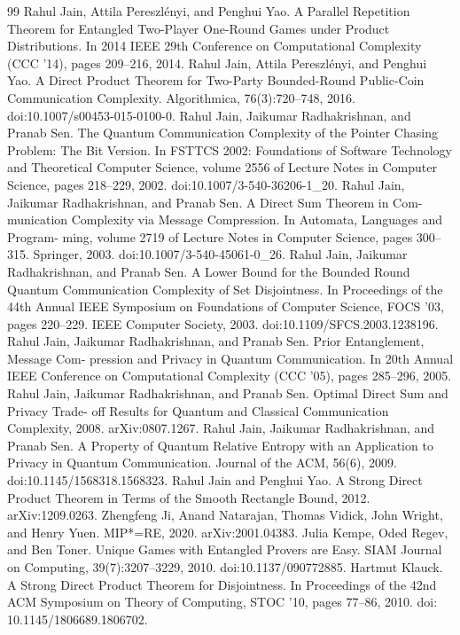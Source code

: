 \begin{thebibliography}{99}
 Rahul Jain, Attila Pereszlényi, and Penghui Yao. A Parallel Repetition Theorem for Entangled Two-Player One-Round Games under Product Distributions. In 2014 IEEE 29th Conference on Computational Complexity (CCC ’14), pages 209–216, 2014.
 Rahul Jain, Attila Pereszlényi, and Penghui Yao. A Direct Product Theorem for Two-Party Bounded-Round Public-Coin Communication Complexity. Algorithmica, 76(3):720–748, 2016. doi:10.1007/s00453-015-0100-0.
 Rahul Jain, Jaikumar Radhakrishnan, and Pranab Sen. The Quantum Communication Complexity of the Pointer Chasing Problem: The Bit Version. In FSTTCS 2002: Foundations of Software Technology and Theoretical Computer Science, volume 2556 of Lecture Notes in Computer Science, pages 218–229, 2002. doi:10.1007/3-540-36206-1\_20.
 Rahul Jain, Jaikumar Radhakrishnan, and Pranab Sen. A Direct Sum Theorem in Com- munication Complexity via Message Compression. In Automata, Languages and Program- ming, volume 2719 of Lecture Notes in Computer Science, pages 300–315. Springer, 2003. doi:10.1007/3-540-45061-0\_26.
 Rahul Jain, Jaikumar Radhakrishnan, and Pranab Sen. A Lower Bound for the Bounded Round Quantum Communication Complexity of Set Disjointness. In Proceedings of the 44th Annual IEEE Symposium on Foundations of Computer Science, FOCS ’03, pages 220–229. IEEE Computer Society, 2003. doi:10.1109/SFCS.2003.1238196.
 Rahul Jain, Jaikumar Radhakrishnan, and Pranab Sen. Prior Entanglement, Message Com- pression and Privacy in Quantum Communication. In 20th Annual IEEE Conference on Computational Complexity (CCC ’05), pages 285–296, 2005.
 Rahul Jain, Jaikumar Radhakrishnan, and Pranab Sen. Optimal Direct Sum and Privacy Trade- off Results for Quantum and Classical Communication Complexity, 2008. arXiv:0807.1267.
 Rahul Jain, Jaikumar Radhakrishnan, and Pranab Sen. A Property of Quantum Relative Entropy with an Application to Privacy in Quantum Communication. Journal of the ACM, 56(6), 2009. doi:10.1145/1568318.1568323.
 Rahul Jain and Penghui Yao. A Strong Direct Product Theorem in Terms of the Smooth Rectangle Bound, 2012. arXiv:1209.0263.
 Zhengfeng Ji, Anand Natarajan, Thomas Vidick, John Wright, and Henry Yuen. MIP*=RE, 2020. arXiv:2001.04383.
 Julia Kempe, Oded Regev, and Ben Toner. Unique Games with Entangled Provers are Easy. SIAM Journal on Computing, 39(7):3207–3229, 2010. doi:10.1137/090772885.
 Hartmut Klauck. A Strong Direct Product Theorem for Disjointness. In Proceedings of the 42nd ACM Symposium on Theory of Computing, STOC ’10, pages 77–86, 2010. doi: 10.1145/1806689.1806702.

\end{thebibliography}
